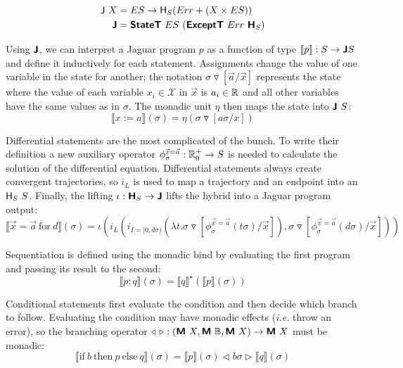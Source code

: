 \begin{equation*}
  \begin{split}
    \functor{J}\ X &= ES \rightarrow \functor{H}_S (Err + (X \times ES)) \\
    \monad{J} &= \monad{StateT}\ ES\ (\monad{ExceptT}\ Err\ \monad{H}_S)
  \end{split}
\end{equation*}

Using $\textbf{\textsf{J}}$, we can interpret a Jaguar program $p$ as a function of type $\llbracket p \rrbracket : S \rightarrow \textbf{\textsf{J}} S$ and define it inductively for each statement. Assignments change the value of one variable in the state for another; the notation $\sigma \triangledown[\vec{a} / \vec{x}]$ represents the state where the value of each variable $x_i \in \mathcal{X}$ in $\vec{x}$ is $a_i \in \mathbb{R}$ and all other variables have the same values as in $\sigma$. The monadic unit $\eta$ then maps the state into $\monad{J} \ S$:
\begin{equation*}
  \llbracket x := a \rrbracket (\sigma) = \eta (\sigma \triangledown [a \sigma / x])
\end{equation*}

Differential statements are the most complicated of the bunch. To write their definition a new auxiliary operator $\phi_\sigma^{\vec{x}=\vec{a}} : \mathbb{R}_0^+ \rightarrow S$ is needed to calculate the solution of the differential equation. Differential statements always create convergent trajectories, so $i_L$ is used to map a trajectory and an endpoint into an $\textsf{H}_S \ S$. Finally, the lifting $\iota : \textbf{\textsf{H}}_S \rightarrow \textbf{\textsf{J}}$ lifts the hybrid into a Jaguar program output:
\begin{equation*}
  \llbracket \vec{x} = \vec{a}\ \text{for}\ d \rrbracket (\sigma) = \iota (i_L (i_{I=[0,d \sigma)} (\lambda t . \sigma \triangledown [\phi_\sigma^{\vec{x}=\vec{a}} (t \sigma) / \vec{x}]), \sigma \triangledown [\phi_\sigma^{\vec{x}=\vec{a}} (d \sigma) / \vec{x}]))
\end{equation*}

Sequentiation is defined using the monadic bind by evaluating the first program and passing its result to the second:
\begin{equation*}
  \llbracket p ; q \rrbracket (\sigma) = \llbracket q \rrbracket^{\star} (\llbracket p \rrbracket(\sigma))
\end{equation*}

Conditional statements first evaluate the condition and then decide which branch to follow. Evaluating the condition may have monadic effects (\textit{i.e.} throw an error), so the branching operator $\triangleleft\ \triangleright : (\textbf{\textsf{M}} \ X, \textbf{\textsf{M}} \ \mathbb{B}, \textbf{\textsf{M}} \ X) \rightarrow \textbf{\textsf{M}} \ X$ must be monadic:
\begin{equation*}
  \llbracket \text{if}\ b\ \text{then}\ p\ \text{else}\ q \rrbracket (\sigma) = \llbracket p \rrbracket (\sigma) \triangleleft b \sigma \triangleright \llbracket q \rrbracket (\sigma)
\end{equation*}

